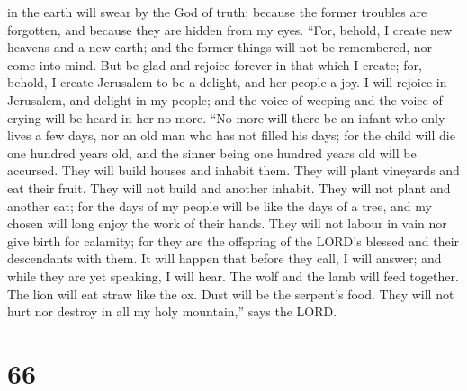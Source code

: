 in the earth will swear by the God of truth; because the former troubles
are forgotten, and because they are hidden from my eyes. 
``For, behold, I create new heavens and a new earth; and the former
things will not be remembered, nor come into mind.  But
be glad and rejoice forever in that which I create; for, behold, I
create Jerusalem to be a delight, and her people a joy. 
I will rejoice in Jerusalem, and delight in my people; and the voice of
weeping and the voice of crying will be heard in her no more.
 ``No more will there be an infant who only lives a few
days, nor an old man who has not filled his days; for the child will die
one hundred years old, and the sinner being one hundred years old will
be accursed.  They will build houses and inhabit them.
They will plant vineyards and eat their fruit.  They will
not build and another inhabit. They will not plant and another eat; for
the days of my people will be like the days of a tree, and my chosen
will long enjoy the work of their hands.  They will not
labour in vain nor give birth for calamity; for they are the offspring
of the LORD's blessed and their descendants with them. 
It will happen that before they call, I will answer; and while they are
yet speaking, I will hear.  The wolf and the lamb will
feed together. The lion will eat straw like the ox. Dust will be the
serpent's food. They will not hurt nor destroy in all my holy
mountain,'' says the LORD.

\hypertarget{section-63}{%
\section{66}\label{section-63}}

